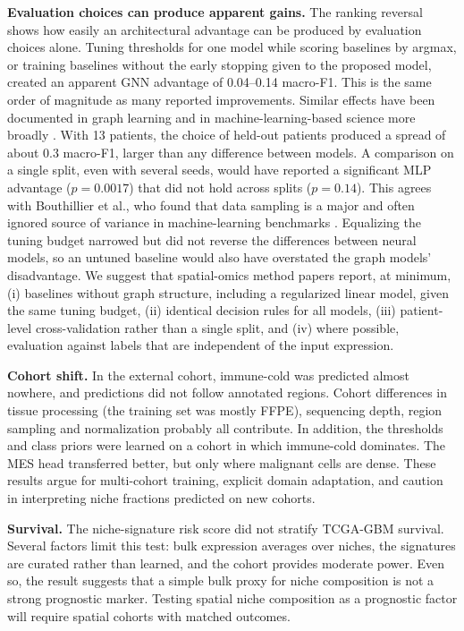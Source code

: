 \documentclass[11pt,letterpaper]{article}
\begin{document}
\textbf{Evaluation choices can produce apparent gains.} The ranking reversal shows how easily an architectural advantage can be produced by evaluation choices alone. Tuning thresholds for one model while scoring baselines by argmax, or training baselines without the early stopping given to the proposed model, created an apparent GNN advantage of 0.04--0.14 macro-F1. This is the same order of magnitude as many reported improvements. Similar effects have been documented in graph learning \cite{shchur2018,errica2020} and in machine-learning-based science more broadly \cite{kapoor2023,varoquaux2022}. With 13 patients, the choice of held-out patients produced a spread of about 0.3 macro-F1, larger than any difference between models. A comparison on a single split, even with several seeds, would have reported a significant MLP advantage ($p = 0.0017$) that did not hold across splits ($p = 0.14$). This agrees with Bouthillier et al., who found that data sampling is a major and often ignored source of variance in machine-learning benchmarks \cite{bouthillier2021}. Equalizing the tuning budget narrowed but did not reverse the differences between neural models, so an untuned baseline would also have overstated the graph models' disadvantage. We suggest that spatial-omics method papers report, at minimum, (i) baselines without graph structure, including a regularized linear model, given the same tuning budget, (ii) identical decision rules for all models, (iii) patient-level cross-validation rather than a single split, and (iv) where possible, evaluation against labels that are independent of the input expression.

\textbf{Cohort shift.} In the external cohort, immune-cold was predicted almost nowhere, and predictions did not follow annotated regions. Cohort differences in tissue processing (the training set was mostly FFPE), sequencing depth, region sampling and normalization probably all contribute. In addition, the thresholds and class priors were learned on a cohort in which immune-cold dominates. The MES head transferred better, but only where malignant cells are dense. These results argue for multi-cohort training, explicit domain adaptation, and caution in interpreting niche fractions predicted on new cohorts.

\textbf{Survival.} The niche-signature risk score did not stratify TCGA-GBM survival. Several factors limit this test: bulk expression averages over niches, the signatures are curated rather than learned, and the cohort provides moderate power. Even so, the result suggests that a simple bulk proxy for niche composition is not a strong prognostic marker. Testing spatial niche composition as a prognostic factor will require spatial cohorts with matched outcomes.
\end{document}
